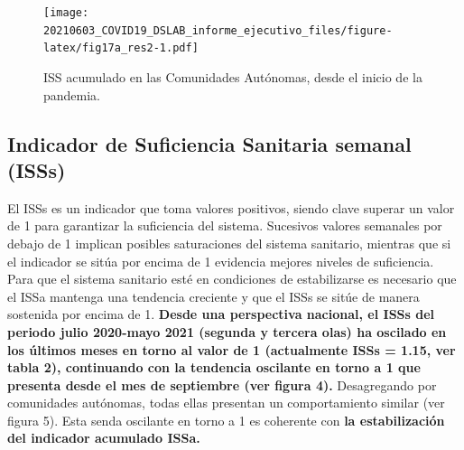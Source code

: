 \documentclass[
  11pt,
]{article}
\begin{document}
\vspace{0.2cm}

\begin{figure}
\centering
\texttt{[image: 20210603\_COVID19\_DSLAB\_informe\_ejecutivo\_files/figure-latex/fig17a\_res2-1.pdf]}
\caption{\label{fig:fig17a_res} ISS acumulado en las Comunidades
Autónomas, desde el inicio de la pandemia.}
\end{figure}

\newpage
\setcounter{page}{6}

\hypertarget{indicador-de-suficiencia-sanitaria-semanal-isss}{%
\subsection{Indicador de Suficiencia Sanitaria semanal
(ISSs)}\label{indicador-de-suficiencia-sanitaria-semanal-isss}}

El ISSs es un indicador que toma valores positivos, siendo clave superar
un valor de 1 para garantizar la suficiencia del sistema. Sucesivos
valores semanales por debajo de 1 implican posibles saturaciones del
sistema sanitario, mientras que si el indicador se sitúa por encima de 1
evidencia mejores niveles de suficiencia. Para que el sistema sanitario
esté en condiciones de estabilizarse es necesario que el ISSa mantenga
una tendencia creciente y que el ISSs se sitúe de manera sostenida por
encima de 1. \textbf{Desde una perspectiva nacional, el ISSs del periodo
julio 2020-mayo 2021 (segunda y tercera olas) ha oscilado en los últimos
meses en torno al valor de 1 (actualmente ISSs = 1.15, ver tabla 2),
continuando con la tendencia oscilante en torno a 1 que presenta desde
el mes de septiembre (ver figura 4).} Desagregando por comunidades
autónomas, todas ellas presentan un comportamiento similar (ver figura
5). Esta senda oscilante en torno a 1 es coherente con \textbf{la
estabilización del indicador acumulado ISSa.}
\end{document}
